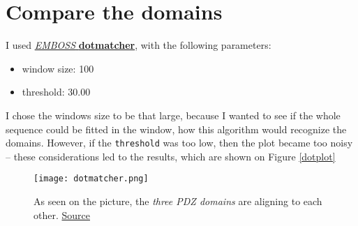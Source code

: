 \chapter{Compare the domains}

I used \href{http://www.bioinformatics.nl/cgi-bin/emboss/dotmatcher}{\emph{EMBOSS} \textbf{dotmatcher}}, with the following parameters:

\begin{itemize}
\item window size: 100
\item threshold: 30.00
\end{itemize}

I chose the windows size to be that large, because I wanted to see if the whole sequence could be fitted in the window, how this algorithm would recognize the domains. However, if the \texttt{threshold} was too low, then the plot became too noisy -- these considerations led to the results, which are shown on Figure \ref{dotplot}


\begin{figure}
\centering
\texttt{[image: dotmatcher.png]}
\caption{As seen on the picture, the \emph{three PDZ domains} are aligning to each other.
\href{http://www.bioinformatics.nl/emboss-explorer/output/146118/dotmatcher.1.png}{Source}}
\label{phytree1}
\end{figure}